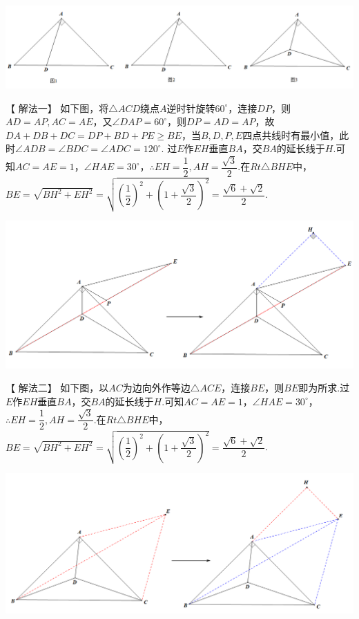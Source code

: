 \documentclass[10pt]{ctexart}
\begin{document}
\begin{center}
	\includegraphics[scale=0.5]{figure/feimadian16}
\end{center}

{\kaishu\color{blue}【 解法一】 如下图，将$\triangle ACD$绕点$A$逆时针旋转$60^\circ$，连接$DP$，则$AD=AP,AC=AE$，又$\angle DAP=60^\circ$，则$DP=AD=AP$，故$DA+DB+DC=DP+BD+PE\geqslant BE$，当$B,D,P,E$四点共线时有最小值，此时$\angle ADB=\angle BDC=\angle ADC=120^\circ$.
过$E$作$EH$垂直$BA$，交$BA$的延长线于$H$.可知$AC=AE=1$，$\angle HAE=30^\circ$，$\therefore EH=\dfrac{1}{2},AH=\dfrac{\sqrt{3}}{2}$.在$Rt\triangle BHE$中，$BE=\sqrt{BH^2+EH^2}=\sqrt{\left(\dfrac{1}{2}\right)^2+\left(1+\dfrac{\sqrt{3}}{2}\right)^2}=\dfrac{\sqrt{6}+\sqrt{2}}{2}$}.

\begin{center}
	\includegraphics[scale=0.5]{figure/feimadian21}
\end{center}

{\kaishu\color{blue}【 解法二】 如下图，以$AC$为边向外作等边$\triangle ACE$，连接$BE$，则$BE$即为所求.过$E$作$EH$垂直$BA$，交$BA$的延长线于$H$.可知$AC=AE=1$，$\angle HAE=30^\circ$，$\therefore EH=\dfrac{1}{2},AH=\dfrac{\sqrt{3}}{2}$.在$Rt\triangle BHE$中，$BE=\sqrt{BH^2+EH^2}=\sqrt{\left(\dfrac{1}{2}\right)^2+\left(1+\dfrac{\sqrt{3}}{2}\right)^2}=\dfrac{\sqrt{6}+\sqrt{2}}{2}$}.

\begin{center}
	\includegraphics[scale=0.5]{figure/feimadian20}
\end{center}
\end{document}
